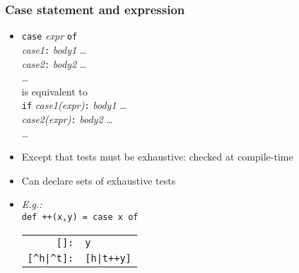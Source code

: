 \documentclass[12pt]{beamer}
\begin{document}
\begin{frame}
\frametitle{Case statement and expression}
\begin{itemize}
\item \texttt{case} \emph{expr} \texttt{of} \\
\hspace*{1em} \emph{case1}\texttt{:} \emph{body1} \ldots \\
\hspace*{1em} \emph{case2}\texttt{:} \emph{body2} \ldots \\
\hspace*{1em} \ldots \\[2ex]
is equivalent to \\[2ex]
 \texttt{if} \emph{case1(expr)}\texttt{:} \emph{body1} \ldots \\
\hspace*{1em} \emph{case2(expr)}\texttt{:} \emph{body2} \ldots \\
\hspace*{1em} \ldots
\item Except that tests must be exhaustive: checked at compile-time
\item Can declare sets of exhaustive tests
\item \emph{E.g.:}\\
  \texttt{def ++(x,y) = case x of} \\
\hspace*{3em}
\begin{tabular}{rl}
\texttt{[]:} & \texttt{y}\\
\texttt{[\^{ }h|\^{ }t]:} & \texttt{[h|t++y]}\\
\end{tabular}
\end{itemize}
\end{frame}
\end{document}
